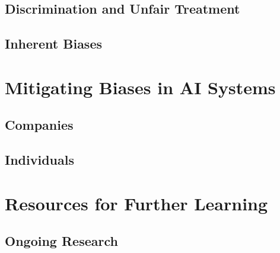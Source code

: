 \documentclass[
]{book}
\begin{document}
\hypertarget{discrimination-and-unfair-treatment}{%
\section{Discrimination and Unfair Treatment}\label{discrimination-and-unfair-treatment}}

\hypertarget{inherent-biases}{%
\section{Inherent Biases}\label{inherent-biases}}

\hypertarget{mitigating-biases-in-ai-systems}{%
\chapter{Mitigating Biases in AI Systems}\label{mitigating-biases-in-ai-systems}}

\hypertarget{companies}{%
\section{Companies}\label{companies}}

\hypertarget{individuals}{%
\section{Individuals}\label{individuals}}

\hypertarget{resources-for-further-learning}{%
\chapter{Resources for Further Learning}\label{resources-for-further-learning}}

\hypertarget{ongoing-research}{%
\section{Ongoing Research}\label{ongoing-research}}
\end{document}
